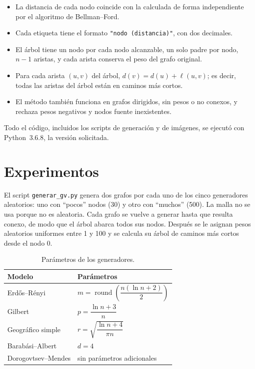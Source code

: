 \documentclass[11pt,letterpaper]{article}
\begin{document}
\begin{itemize}
    \item La distancia de cada nodo coincide con la calculada de forma independiente
          por el algoritmo de Bellman--Ford.
    \item Cada etiqueta tiene el formato \texttt{"nodo (distancia)"}, con dos
          decimales.
    \item El árbol tiene un nodo por cada nodo alcanzable, un solo padre por nodo,
          $n - 1$ aristas, y cada arista conserva el peso del grafo original.
    \item Para cada arista $(u, v)$ del árbol, $d(v) = d(u) + \ell(u, v)$; es decir,
          todas las aristas del árbol están en caminos más cortos.
    \item El método también funciona en grafos dirigidos, sin pesos o no conexos, y
          rechaza pesos negativos y nodos fuente inexistentes.
\end{itemize}

Todo el código, incluidos los scripts de generación y de imágenes, se ejecutó con
Python~3.6.8, la versión solicitada.

\section{Experimentos}

El script \texttt{generar\_gv.py} genera dos grafos por cada uno de los cinco
generadores aleatorios: uno con ``pocos'' nodos (30) y otro con ``muchos'' (500).
La malla no se usa porque no es aleatoria. Cada grafo se vuelve a generar hasta
que resulta conexo, de modo que el árbol abarca todos sus nodos. Después se le
asignan pesos aleatorios uniformes entre 1 y 100 y se calcula su árbol de caminos
más cortos desde el nodo $0$.

\begin{table}[H]
\centering
\begin{tabular}{ll}
\toprule
Modelo & Parámetros \\
\midrule
Erd\H{o}s--Rényi & $m = \operatorname{round}\!\left(\dfrac{n(\ln n + 2)}{2}\right)$ \\[10pt]
Gilbert & $p = \dfrac{\ln n + 3}{n}$ \\[10pt]
Geográfico simple & $r = \sqrt{\dfrac{\ln n + 4}{\pi n}}$ \\[10pt]
Barabási--Albert & $d = 4$ \\[4pt]
Dorogovtsev--Mendes & sin parámetros adicionales \\
\bottomrule
\end{tabular}
\caption{Parámetros de los generadores.}
\end{table}
\end{document}
